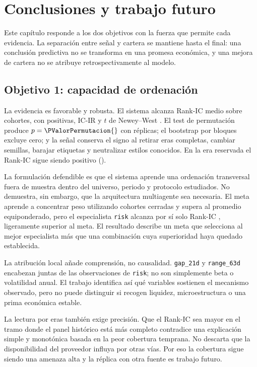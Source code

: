 \chapter{Conclusiones y trabajo futuro}
\label{chap:conclusiones}

Este capítulo responde a los dos objetivos con la fuerza que permite cada evidencia. La separación
entre señal y cartera se mantiene hasta el final: una conclusión predictiva no se transforma en una
promesa económica, y una mejora de cartera no se atribuye retrospectivamente al modelo.

\section{Objetivo 1: capacidad de ordenación}

La evidencia es favorable y robusta. El sistema alcanza Rank-IC medio \RankICSeleccion{} sobre
\CohortesSeleccion{} cohortes, con \FraccionICPositiva{} positivas, IC-IR \ICIRSeleccion{} y $t$ de
Newey--West \TNeweyWest{}. El test de permutación produce $p=\PValorPermutacion{}$ con
\NumPermutaciones{} réplicas; el bootstrap por bloques excluye cero; y la señal conserva el signo al
retirar eras completas, cambiar semillas, barajar etiquetas y neutralizar estilos conocidos. En la
era reservada el Rank-IC sigue siendo positivo (\RankICReservado{}).

La formulación defendible es que el sistema aprende una ordenación transversal fuera de muestra
dentro del universo, periodo y protocolo estudiados. No demuestra, sin embargo, que la arquitectura
multiagente sea necesaria. El meta aprende a concentrar peso utilizando cohortes cerradas y supera
al promedio equiponderado, pero el especialista \texttt{risk} alcanza por sí solo Rank-IC
\RankICRisk{}, ligeramente superior al meta. El resultado describe un meta que selecciona al mejor
especialista más que una combinación cuya superioridad haya quedado establecida.

La atribución local añade comprensión, no causalidad. \texttt{gap\_21d} y \texttt{range\_63d}
encabezan juntas \DosVariablesRisk{} de las observaciones de \texttt{risk}; no son simplemente beta
o volatilidad anual. El trabajo identifica así qué variables sostienen el mecanismo observado, pero
no puede distinguir si recogen liquidez, microestructura o una prima económica estable.

La lectura por eras también exige precisión. Que el Rank-IC sea mayor en el tramo donde el panel
histórico está más completo contradice una explicación simple y monotónica basada en la peor
cobertura temprana. No descarta que la disponibilidad del proveedor influya por otras vías. Por eso
la cobertura sigue siendo una amenaza alta y la réplica con otra fuente es trabajo futuro.

